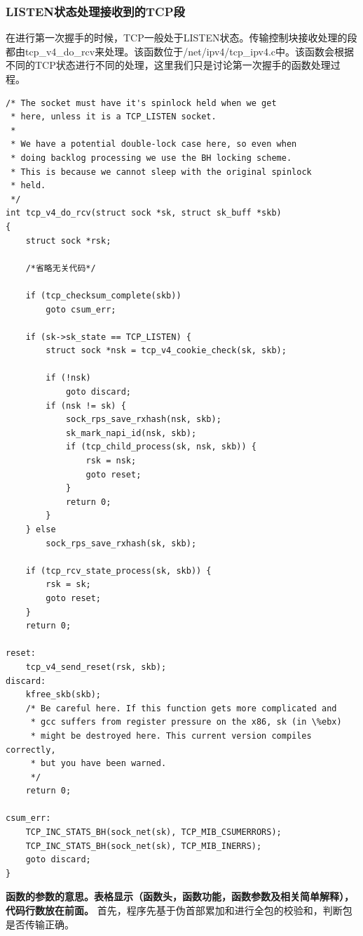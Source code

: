            \subsubsection{LISTEN状态处理接收到的TCP段}
                在进行第一次握手的时候，TCP一般处于LISTEN状态。传输控制块接收处理的段都由tcp\_v4\_do\_rcv来处理。该函数位于/net/ipv4/tcp\_ipv4.c中。该函数会根据不同的TCP状态进行不同的处理，这里我们只是讨论第一次握手的函数处理过程。
\begin{verbatim}
/* The socket must have it's spinlock held when we get
 * here, unless it is a TCP_LISTEN socket.
 *
 * We have a potential double-lock case here, so even when
 * doing backlog processing we use the BH locking scheme.
 * This is because we cannot sleep with the original spinlock
 * held.
 */
int tcp_v4_do_rcv(struct sock *sk, struct sk_buff *skb)
{
    struct sock *rsk;

    /*省略无关代码*/

    if (tcp_checksum_complete(skb))
        goto csum_err;

    if (sk->sk_state == TCP_LISTEN) {
        struct sock *nsk = tcp_v4_cookie_check(sk, skb);

        if (!nsk)
            goto discard;
        if (nsk != sk) {
            sock_rps_save_rxhash(nsk, skb);
            sk_mark_napi_id(nsk, skb);
            if (tcp_child_process(sk, nsk, skb)) {
                rsk = nsk;
                goto reset;
            }
            return 0;
        }
    } else
        sock_rps_save_rxhash(sk, skb);

    if (tcp_rcv_state_process(sk, skb)) {
        rsk = sk;
        goto reset;
    }
    return 0;

reset:
    tcp_v4_send_reset(rsk, skb);
discard:
    kfree_skb(skb);
    /* Be careful here. If this function gets more complicated and
     * gcc suffers from register pressure on the x86, sk (in \%ebx)
     * might be destroyed here. This current version compiles correctly,
     * but you have been warned.
     */
    return 0;

csum_err:
    TCP_INC_STATS_BH(sock_net(sk), TCP_MIB_CSUMERRORS);
    TCP_INC_STATS_BH(sock_net(sk), TCP_MIB_INERRS);
    goto discard;
}
\end{verbatim}

                \textbf{函数的参数的意思。表格显示（函数头，函数功能，函数参数及相关简单解释），代码行数放在前面。}
                首先，程序先基于伪首部累加和进行全包的校验和，判断包是否传输正确。

